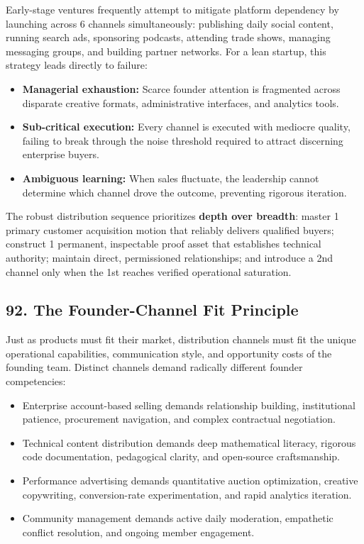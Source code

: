 Early-stage ventures frequently attempt to mitigate platform dependency by launching across 6 channels simultaneously: publishing daily social content, running search ads, sponsoring podcasts, attending trade shows, managing messaging groups, and building partner networks. For a lean startup, this strategy leads directly to failure:
\begin{itemize}[leftmargin=*,itemsep=1pt]
  \item \textbf{Managerial exhaustion:} Scarce founder attention is fragmented across disparate creative formats, administrative interfaces, and analytics tools.
  \item \textbf{Sub-critical execution:} Every channel is executed with mediocre quality, failing to break through the noise threshold required to attract discerning enterprise buyers.
  \item \textbf{Ambiguous learning:} When sales fluctuate, the leadership cannot determine which channel drove the outcome, preventing rigorous iteration.
\end{itemize}

The robust distribution sequence prioritizes \textbf{depth over breadth}: master 1 primary customer acquisition motion that reliably delivers qualified buyers; construct 1 permanent, inspectable proof asset that establishes technical authority; maintain direct, permissioned relationships; and introduce a 2nd channel only when the 1st reaches verified operational saturation.

\subsection*{92. The Founder-Channel Fit Principle}

Just as products must fit their market, distribution channels must fit the unique operational capabilities, communication style, and opportunity costs of the founding team. Distinct channels demand radically different founder competencies:
\begin{itemize}[leftmargin=*,itemsep=1pt]
  \item Enterprise account-based selling demands relationship building, institutional patience, procurement navigation, and complex contractual negotiation.
  \item Technical content distribution demands deep mathematical literacy, rigorous code documentation, pedagogical clarity, and open-source craftsmanship.
  \item Performance advertising demands quantitative auction optimization, creative copywriting, conversion-rate experimentation, and rapid analytics iteration.
  \item Community management demands active daily moderation, empathetic conflict resolution, and ongoing member engagement.
\end{itemize}


